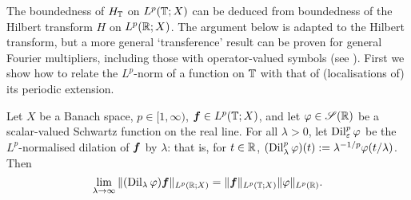   The boundedness of $H_{\mathbb{T}}$ on $L^p(\mathbb{T};X)$ can be deduced from boundedness of the Hilbert transform $H$ on $L^p(\mathbb{R};X)$.
  The argument below is adapted to the Hilbert transform, but a more general `transference' result can be proven for general Fourier multipliers, including those with operator-valued symbols (see \cite[]{HNVW16}).
  First we show how to relate the $L^p$-norm of a function on $\mathbb{T}$ with that of (localisations of) its periodic extension.

  \begin{lem}\label{lem:transference}
    Let $X$ be a Banach space, $p \in [1,\infty)$, $\bm{f} \in L^p(\mathbb{T};X)$, and let $\varphi \in \mathscr{S}(\mathbb{R})$ be a scalar-valued Schwartz function on the real line.
    For all $\lambda > 0$, let $\operatorname{Dil}_{\varepsilon}^{p} \varphi$ be the $L^p$-normalised dilation of $\bm{f}$ by $\lambda$: that is, for $t \in \mathbb{R}$, $(\operatorname{Dil}_{\lambda}^{p}\varphi)(t) := \lambda^{-1/p} \varphi(t/\lambda)$.
    Then
    \begin{equation*}
        \lim_{\lambda \to \infty} \| (\operatorname{Dil}_{\lambda}\varphi) \bm{f} \|_{L^p(\mathbb{R};X)} = \|\bm{f}\|_{L^p(\mathbb{T};X)}\|\varphi\|_{L^p(\mathbb{R})}.
    \end{equation*}
  \end{lem}

